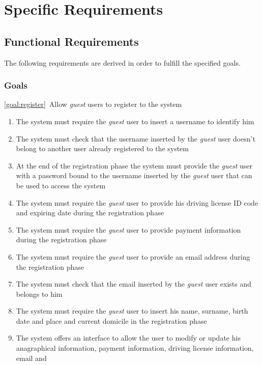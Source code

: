 \section{Specific Requirements}

\subsection{Functional Requirements}
The following requirements are derived in order to fulfill the specified goals.
\subsubsection{Goals}
	\begin{description}
		\item \ref{goal:register}\ Allow \emph{guest} users to register to the system
			\begin{enumerate}[label=\textbf{R\arabic*}]
  				\item The system must require the \emph{guest} user to insert a username to identify him
   				\item The system must check that the username inserted by the  \emph{guest} user
   				doesn't belong to another user already registered to the system 
   				\item At the end of the registration phase the system must provide the  \emph{guest}
   				user with a password bound to the username inserted by the  \emph{guest} user that can
   				be used to access the system
   				\item The system must require the  \emph{guest} user to provide his driving license ID
   				code and expiring date during the registration phase
   				\item The system must require the  \emph{guest} user to provide payment information
   				during the registration phase
   				\item The system must require the  \emph{guest} user to provide an email address during
   				the	registration phase
   				\item The system must check that the email inserted by the  \emph{guest} user exists
   				and belongs to him
   				\item The system must require the  \emph{guest} user to insert his name, surname,
   				birth date and place and current domicile in the registration phase
   				\item The system offers an interface to allow the user to modify or update his
   				anagraphical information, payment information, driving license information, email and

\end{enumerate}
\end{description}
